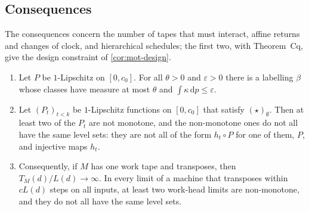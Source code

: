 \subsection{Consequences}\label{sec:mot-consequences}

The consequences concern the number of tapes that must interact, affine returns and changes of clock, and hierarchical
schedules; the first two, with Theorem~Cq, give the design constraint of \cref{cor:mot-design}.

\begin{corollary}\label{cor:mot-one-tape}
\notformalized
\begin{enumerate}[label=(\alph*)]
\item Let $P$ be $1$-Lipschitz on $[0,c_0]$. For all $\theta>0$ and $\varepsilon>0$ there is a labelling $\beta$ whose
classes have measure at most $\theta$ and $\int\kappa\,\mathrm dp\le\varepsilon$.
\item Let $(P_t)_{t<k}$ be $1$-Lipschitz functions on $[0,c_0]$ that satisfy $(\star)_\emptyset$. Then at least two of
the $P_t$ are not monotone, and the non-monotone ones do not all have the same level sets: they are not all of the form
$h_t\circ P$ for one of them, $P$, and injective maps $h_t$.
\item Consequently, if $M$ has one work tape and transposes, then $T_M(d)/L(d)\to\infty$. In every limit of a machine
that transposes within $cL(d)$ steps on all inputs, at least two work-head limits are non-monotone, and they do not all
have the same level sets.
\end{enumerate}
\end{corollary}

